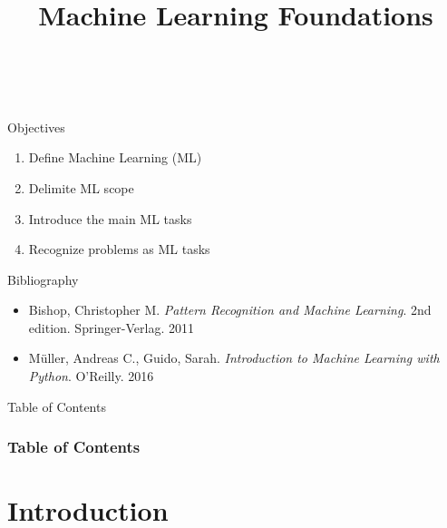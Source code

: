 \documentclass[10pt,compress]{beamer} %
\title[Machine Learning Foundations]{Machine Learning Foundations}
\author{\asignatura\\\carrera}
\institute{}
\date{}
\begin{document}
{\titlepageBlue
    \begin{frame}
        \titlepage
    \end{frame}
}

\institute{\asignatura}

\begin{frame}[plain]{}
   \begin{block}{Objectives}
      \begin{enumerate}
         \item Define Machine Learning (ML)
		 \item Delimite ML scope
         \item Introduce the main ML tasks
         \item Recognize problems as ML tasks
      \end{enumerate} 
   \end{block}

   \begin{block}{Bibliography}
	\begin{itemize}
        \item Bishop, Christopher M. \textit{Pattern Recognition and Machine Learning}. 2nd edition. Springer-Verlag. 2011
        \item M\"uller, Andreas C., Guido, Sarah. \textit{Introduction to Machine Learning with Python}. O'Reilly. 2016
	\end{itemize}
   \end{block}
\end{frame}

{
\begin{frame}[shrink]{Table of Contents}

 	\frametitle{Table of Contents}
  	\begin{multicols}{2}
  		\tableofcontents
    \end{multicols}

\end{frame}
}

\section{Introduction}
\end{document}
